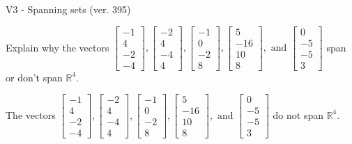 \begin{exercise}
  \begin{exerciseTitle}V3 - Spanning sets (ver. 395)\end{exerciseTitle}
  \begin{exerciseStatement}
    Explain why the vectors \(\left[\begin{array}{r}
-1 \\
4 \\
-2 \\
-4
\end{array}\right] , \left[\begin{array}{r}
-2 \\
4 \\
-4 \\
4
\end{array}\right] , \left[\begin{array}{r}
-1 \\
0 \\
-2 \\
8
\end{array}\right] , \left[\begin{array}{r}
5 \\
-16 \\
10 \\
8
\end{array}\right] , \text{ and } \left[\begin{array}{r}
0 \\
-5 \\
-5 \\
3
\end{array}\right]\) span or don't span \(\mathbb{R}^4\). 
	


  \end{exerciseStatement}
  \begin{exerciseAnswer}
   The vectors \(\left[\begin{array}{r}
-1 \\
4 \\
-2 \\
-4
\end{array}\right] , \left[\begin{array}{r}
-2 \\
4 \\
-4 \\
4
\end{array}\right] , \left[\begin{array}{r}
-1 \\
0 \\
-2 \\
8
\end{array}\right] , \left[\begin{array}{r}
5 \\
-16 \\
10 \\
8
\end{array}\right] , \text{ and } \left[\begin{array}{r}
0 \\
-5 \\
-5 \\
3
\end{array}\right]\) 
  	 do not  
	span \(\mathbb{R}^4\).
  



\end{exerciseAnswer}
\end{exercise}
